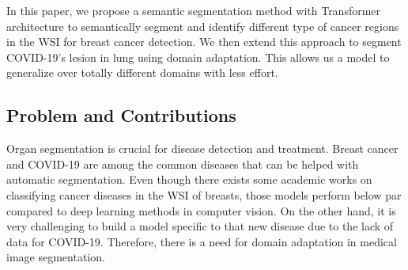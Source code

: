 \documentclass[final]{cvpr}
\begin{document}
In this paper, we propose a semantic segmentation method with Transformer architecture \cite{vaswani2017attention} to semantically segment and identify different type of cancer regions in the WSI for breast cancer detection. We then extend this approach to segment COVID-19's lesion in lung \cite{9385788} using domain adaptation. This allows us a model to generalize over totally different domains with less effort.

\subsection{Problem and Contributions}
Organ segmentation is crucial for disease detection and treatment. Breast cancer and COVID-19 are among the common diseases that can be helped with automatic segmentation. Even though there exists some academic works on classifying cancer diseases in the WSI of breasts, those models perform below par compared to deep learning methods in computer vision. On the other hand, it is very challenging to build a model specific to that new disease due to the lack of data for COVID-19. Therefore, there is a need for domain adaptation in medical image segmentation.
\end{document}
